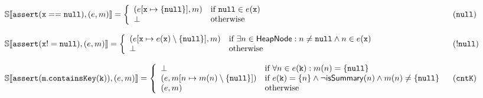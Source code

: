 \begin{figure*}
\[\begin{array}{ll}
\\
\mathbb{S}\llbracket \mathtt{assert(x==null)}, (e, m) \rrbracket = \left\{
\begin{array}{ll}
(e[\mathtt{x} \mapsto \{\mathtt{null}\}], m) & \textrm{if } \mathtt{null} \in e(\mathtt{x})\\
\bot & \textrm{otherwise}\\
\end{array}
\right. & (\mathtt{null})\\
\\
\mathbb{S}\llbracket \mathtt{assert(x!=null)}, (e, m) \rrbracket = \left\{
\begin{array}{ll}
(e[\mathtt{x} \mapsto e(\mathtt{x}) \setminus \{\mathtt{null}\}], m) & \textrm{if } \exists n \in \mathsf{HeapNode} : n \neq \mathtt{null} \land n \in e(\mathtt{x})\\
\bot & \textrm{otherwise}\\
\end{array}
\right. & (\mathtt{!null})\\
\\
\mathbb{S}\llbracket \mathtt{assert(m.containsKey(k))}, (e, m) \rrbracket = \left\{
\begin{array}{ll}
\bot & \textrm{if } \forall n \in e(\mathtt{k}) : m(n)=\{\mathtt{null}\}\\
(e, m[n \mapsto m(n)\setminus\{\mathtt{null}\}]) & \textrm{if } e(\mathtt{k}) = \{n\} \land \neg \mathsf{isSummary}(n) \land m(n) \neq \{\mathtt{null}\}\\
(e, m) & \textrm{otherwise}\\
\end{array}
\right. & (\mathtt{cntK})\\

\end{array}\]
\end{figure*}
